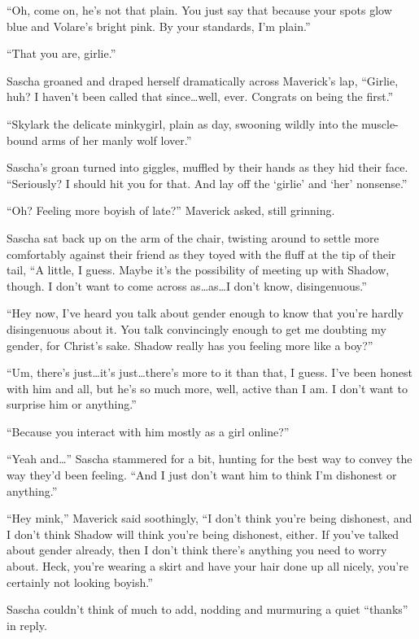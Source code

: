\documentclass[12pt,letterpaper,oneside]{memoir}
\begin{document}
  ``Oh, come on, he's not that plain. You just say that because your spots glow blue and Volare's bright pink. By your standards, I'm plain.''

  ``That you are, girlie.''

  Sascha groaned and draped herself dramatically across Maverick's lap, ``Girlie, huh? I haven't been called that since\ldots{}well, ever. Congrats on being the first.''

  ``Skylark the delicate minkygirl, plain as day, swooning wildly into the muscle-bound arms of her manly wolf lover.''

  Sascha's groan turned into giggles, muffled by their hands as they hid their face. ``Seriously? I should hit you for that. And lay off the `girlie' and `her' nonsense.''

  ``Oh? Feeling more boyish of late?'' Maverick asked, still grinning.

  Sascha sat back up on the arm of the chair, twisting around to settle more comfortably against their friend as they toyed with the fluff at the tip of their tail, ``A little, I guess. Maybe it's the possibility of meeting up with Shadow, though. I don't want to come across as\ldots{}as\ldots{}I don't know, disingenuous.''

  ``Hey now, I've heard you talk about gender enough to know that you're hardly disingenuous about it. You talk convincingly enough to get me doubting my gender, for Christ's sake. Shadow really has you feeling more like a boy?''

  ``Um, there's just\ldots{}it's just\ldots{}there's more to it than that, I guess. I've been honest with him and all, but he's so much more, well, active than I am. I don't want to surprise him or anything.''

  ``Because you interact with him mostly as a girl online?''

  ``Yeah and\ldots{}'' Sascha stammered for a bit, hunting for the best way to convey the way they'd been feeling. ``And I just don't want him to think I'm dishonest or anything.''

  ``Hey mink,'' Maverick said soothingly, ``I don't think you're being dishonest, and I don't think Shadow will think you're being dishonest, either. If you've talked about gender already, then I don't think there's anything you need to worry about. Heck, you're wearing a skirt and have your hair done up all nicely, you're certainly not looking boyish.''

  Sascha couldn't think of much to add, nodding and murmuring a quiet ``thanks'' in reply.
\end{document}
